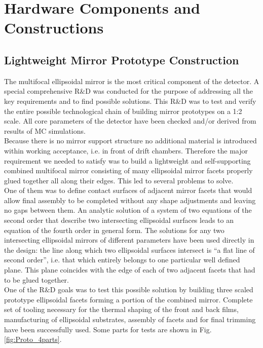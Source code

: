 \section{Hardware Components and Constructions}
\subsection{Lightweight Mirror Prototype Construction}
The multifocal ellipsoidal mirror is the most critical component of the detector. A special comprehensive R$\&$D was conducted for the purpose of addressing all the key requirements and to find possible solutions. This R$\&$D was to test and verify the entire possible technological chain of building mirror prototypes on a 1:2 scale. All core parameters of the detector have been checked and/or derived from results of MC simulations. \\
\indent Because there is no mirror support structure no additional material is introduced  within working acceptance, i.e. in front of drift chambers. Therefore the major requirement we needed to satisfy was to build a lightweight and self-supporting combined multifocal mirror consisting of many ellipsoidal mirror facets properly glued together all along their edges. This led to several problems to solve. \\
\indent One of them was to define contact surfaces of adjacent mirror facets that would allow final assembly to be completed without any shape adjustments and leaving no gaps between them. An analytic solution of a system of two equations of the second order that describe two intersecting ellipsoidal surfaces leads to an equation of the fourth order in general form. The solutions for any two intersecting ellipsoidal mirrors of different parameters have been used directly in the design: the line along which two ellipsoidal surfaces intersect is “a flat line of second order”, i.e. that which entirely belongs to one particular well defined plane. This plane coincides with the edge of each of two adjacent facets that had to be glued together.  
\\
\indent One of the R$\&$D goals was to test this possible solution by building three scaled prototype ellipsoidal facets forming a portion of the combined mirror. Complete set of tooling necessary for the thermal shaping of the front and back films, manufacturing of ellipsoidal substrates, assembly of facets and for final trimming have been successfully used. Some parts for tests are shown in Fig. \ref{fig:Proto_4parts}.

